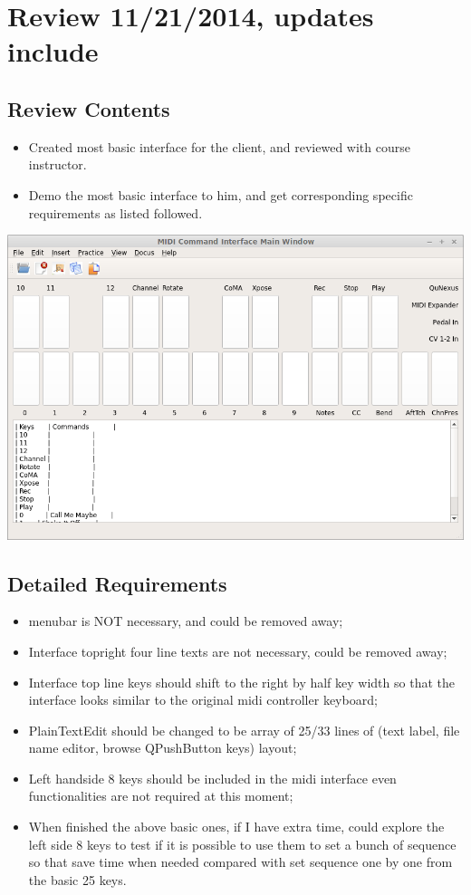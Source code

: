 \documentclass[9pt,b5paper]{article}
\begin{document}
\section{Review 11/21/2014, updates include}
\label{sec-3}
\subsection{Review Contents}
\label{sec-3-1}
\begin{itemize}
\item Created most basic interface for the client, and reviewed with course instructor.
\item Demo the most basic interface to him, and get corresponding specific requirements as listed followed.
\end{itemize}

\includegraphics[width=.9\linewidth]{./pic/2014-11-20_21:52:19.png}

\subsection{Detailed Requirements}
\label{sec-3-2}
\begin{itemize}
\item menubar is NOT necessary, and could be removed away;
\item Interface topright four line texts are not necessary, could be removed away;
\item Interface top line keys should shift to the right by half key width so that the interface looks similar to the original midi controller keyboard;
\item PlainTextEdit should be changed to be array of 25/33 lines of (text label, file name editor, browse QPushButton keys) layout;
\item Left handside 8 keys should be included in the midi interface even functionalities are not required at this moment;
\item When finished the above basic ones, if I have extra time, could explore the left side 8 keys to test if it is possible to use them to set a bunch of sequence so that save time when needed compared with set sequence one by one from the basic 25 keys.
\end{itemize}
\end{document}
